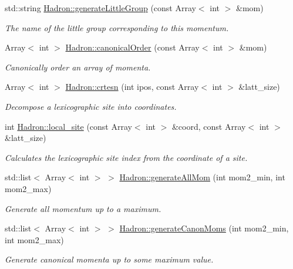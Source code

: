 \begin{DoxyCompactItemize}
std\+::string \mbox{\hyperlink{namespaceHadron_a511bab858a88c02ec88a697fd5430e0d}{Hadron\+::generate\+Little\+Group}} (const Array$<$ int $>$ \&mom)
\begin{DoxyCompactList}\small\item\em The name of the little group corresponding to this momentum. \end{DoxyCompactList}\item 
Array$<$ int $>$ \mbox{\hyperlink{namespaceHadron_a12bd76a337723c31527ee95d46f170d1}{Hadron\+::canonical\+Order}} (const Array$<$ int $>$ \&mom)
\begin{DoxyCompactList}\small\item\em Canonically order an array of momenta. \end{DoxyCompactList}\item 
Array$<$ int $>$ \mbox{\hyperlink{namespaceHadron_a10fe1c3c465ac8dd8b6edab007aa6ab7}{Hadron\+::crtesn}} (int ipos, const Array$<$ int $>$ \&latt\+\_\+size)
\begin{DoxyCompactList}\small\item\em Decompose a lexicographic site into coordinates. \end{DoxyCompactList}\item 
int \mbox{\hyperlink{namespaceHadron_ab96485b602362d63c3326d4326e3733d}{Hadron\+::local\+\_\+site}} (const Array$<$ int $>$ \&coord, const Array$<$ int $>$ \&latt\+\_\+size)
\begin{DoxyCompactList}\small\item\em Calculates the lexicographic site index from the coordinate of a site. \end{DoxyCompactList}\item 
std\+::list$<$ Array$<$ int $>$ $>$ \mbox{\hyperlink{namespaceHadron_aa0ad60c011c7668c5389ce9286b3c8dd}{Hadron\+::generate\+All\+Mom}} (int mom2\+\_\+min, int mom2\+\_\+max)
\begin{DoxyCompactList}\small\item\em Generate all momentum up to a maximum. \end{DoxyCompactList}\item 
std\+::list$<$ Array$<$ int $>$ $>$ \mbox{\hyperlink{namespaceHadron_af42e0a1c54e10b67abac83c56c67b40e}{Hadron\+::generate\+Canon\+Moms}} (int mom2\+\_\+min, int mom2\+\_\+max)
\begin{DoxyCompactList}\small\item\em Generate canonical momenta up to some maximum value. \end{DoxyCompactList}\item 

\end{DoxyCompactItemize}
